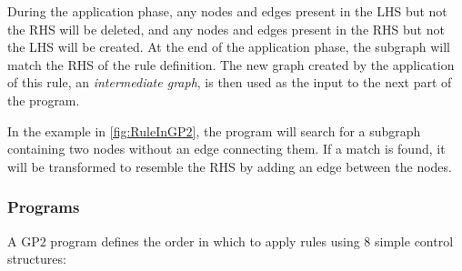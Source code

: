 \documentclass[authoryearcitations]{UoYCSproject}
\begin{document}
During the application phase, any nodes and edges present in the LHS but not the RHS
will be deleted, and any nodes and edges present in the RHS but not the LHS will be
created. At the end of the application phase, the subgraph will match the RHS of the
rule definition. The new graph created by the application of this rule, an \emph{intermediate
graph}, is then used as the input to the next part of the program.

In the example in \autoref{fig:RuleInGP2}, the program will search for a subgraph
containing two nodes without an edge connecting them. If a match is found, it will
be transformed to resemble the RHS by adding an edge between the nodes.

\subsubsection{Programs}

A GP2 program defines the order in which to apply rules using 8 simple control
structures:
\end{document}
